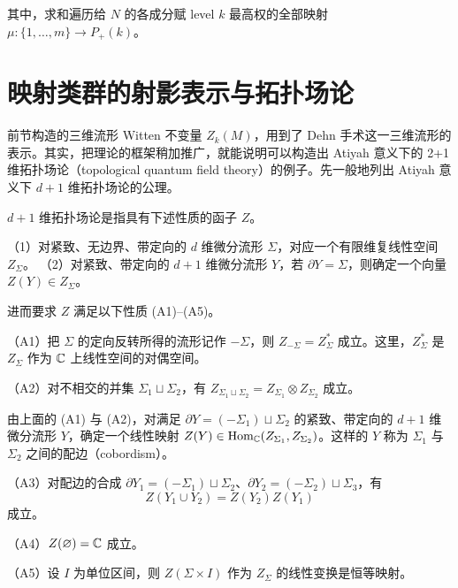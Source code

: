 其中，求和遍历给 $N$ 的各成分赋 level $k$ 最高权的全部映射 $\mu:\{1,\dots,m\}\to P_+(k)$。

\section{映射类群的射影表示与拓扑场论}

前节构造的三维流形 Witten 不变量 $Z_k(M)$，用到了 Dehn 手术这一三维流形的表示。其实，把理论的框架稍加推广，就能说明可以构造出 Atiyah 意义下的 2+1 维拓扑场论（topological quantum field theory）的例子。先一般地列出 Atiyah 意义下 $d+1$ 维拓扑场论的公理。

$d+1$ 维拓扑场论是指具有下述性质的函子 $Z$。

（1）对紧致、无边界、带定向的 $d$ 维微分流形 $\Sigma$，对应一个有限维复线性空间 $Z_\Sigma$。
（2）对紧致、带定向的 $d+1$ 维微分流形 $Y$，若 $\partial Y=\Sigma$，则确定一个向量 $Z(Y)\in Z_\Sigma$。

进而要求 $Z$ 满足以下性质 (A1)--(A5)。

（A1）把 $\Sigma$ 的定向反转所得的流形记作 $-\Sigma$，则 $Z_{-\Sigma}=Z_\Sigma^*$ 成立。这里，$Z_\Sigma^*$ 是 $Z_\Sigma$ 作为 $\mathbb{C}$ 上线性空间的对偶空间。

（A2）对不相交的并集 $\Sigma_1\sqcup\Sigma_2$，有 $Z_{\Sigma_1\sqcup\Sigma_2}=Z_{\Sigma_1}\otimes Z_{\Sigma_2}$ 成立。

由上面的 (A1) 与 (A2)，对满足 $\partial Y=(-\Sigma_1)\sqcup\Sigma_2$ 的紧致、带定向的 $d+1$ 维微分流形 $Y$，确定一个线性映射 $Z(Y)\in\operatorname{Hom}_{\mathbb{C}}(Z_{\Sigma_1},Z_{\Sigma_2})$。这样的 $Y$ 称为 $\Sigma_1$ 与 $\Sigma_2$ 之间的配边（cobordism）。

（A3）对配边的合成 $\partial Y_1=(-\Sigma_1)\sqcup\Sigma_2$、$\partial Y_2=(-\Sigma_2)\sqcup\Sigma_3$，有
\[
  Z(Y_1\cup Y_2)=Z(Y_2)Z(Y_1)
\]
成立。


（A4）$Z(\varnothing)=\mathbb{C}$ 成立。

（A5）设 $I$ 为单位区间，则 $Z(\Sigma\times I)$ 作为 $Z_\Sigma$ 的线性变换是恒等映射。

